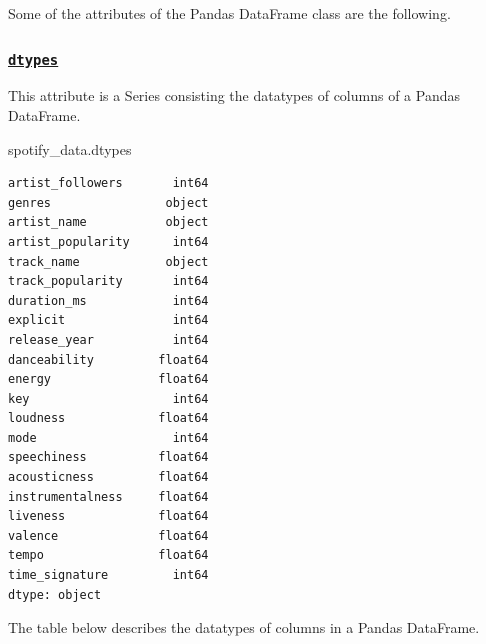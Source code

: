 \documentclass[
  letterpaper,
  DIV=11,
  numbers=noendperiod]{scrreprt}
\newenvironment{Shaded}{\begin{snugshade}}{\end{snugshade}}
\newcommand{\NormalTok}[1]{\textcolor[rgb]{0.00,0.23,0.31}{#1}}
\begin{document}
Some of the attributes of the Pandas DataFrame class are the following.

\hypertarget{dtypes}{%
\subsubsection{\texorpdfstring{\href{https://pandas.pydata.org/docs/reference/api/pandas.DataFrame.dtypes.html}{\texttt{dtypes}}}{dtypes}}\label{dtypes}}

This attribute is a Series consisting the datatypes of columns of a
Pandas DataFrame.

\begin{Shaded}
\begin{Highlighting}[]
\NormalTok{spotify\_data.dtypes}
\end{Highlighting}
\end{Shaded}

\begin{verbatim}
artist_followers       int64
genres                object
artist_name           object
artist_popularity      int64
track_name            object
track_popularity       int64
duration_ms            int64
explicit               int64
release_year           int64
danceability         float64
energy               float64
key                    int64
loudness             float64
mode                   int64
speechiness          float64
acousticness         float64
instrumentalness     float64
liveness             float64
valence              float64
tempo                float64
time_signature         int64
dtype: object
\end{verbatim}

The table below describes the datatypes of columns in a Pandas
DataFrame.
\end{document}
